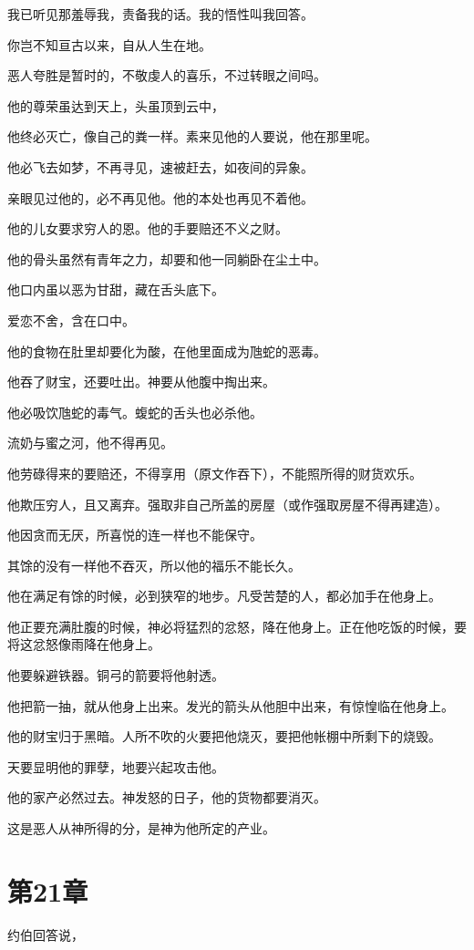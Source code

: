 \documentclass[12pt,oneside]{book}
\begin{document}
我已听见那羞辱我，责备我的话。我的悟性叫我回答。

你岂不知亘古以来，自从人生在地。

恶人夸胜是暂时的，不敬虔人的喜乐，不过转眼之间吗。

他的尊荣虽达到天上，头虽顶到云中，

他终必灭亡，像自己的粪一样。素来见他的人要说，他在那里呢。

他必飞去如梦，不再寻见，速被赶去，如夜间的异象。

亲眼见过他的，必不再见他。他的本处也再见不着他。

他的儿女要求穷人的恩。他的手要赔还不义之财。

他的骨头虽然有青年之力，却要和他一同躺卧在尘土中。

他口内虽以恶为甘甜，藏在舌头底下。

爱恋不舍，含在口中。

他的食物在肚里却要化为酸，在他里面成为虺蛇的恶毒。

他吞了财宝，还要吐出。神要从他腹中掏出来。

他必吸饮虺蛇的毒气。蝮蛇的舌头也必杀他。

流奶与蜜之河，他不得再见。

他劳碌得来的要赔还，不得享用（原文作吞下），不能照所得的财货欢乐。

他欺压穷人，且又离弃。强取非自己所盖的房屋（或作强取房屋不得再建造）。

他因贪而无厌，所喜悦的连一样也不能保守。

其馀的没有一样他不吞灭，所以他的福乐不能长久。

他在满足有馀的时候，必到狭窄的地步。凡受苦楚的人，都必加手在他身上。

他正要充满肚腹的时候，神必将猛烈的忿怒，降在他身上。正在他吃饭的时候，要将这忿怒像雨降在他身上。

他要躲避铁器。铜弓的箭要将他射透。

他把箭一抽，就从他身上出来。发光的箭头从他胆中出来，有惊惶临在他身上。

他的财宝归于黑暗。人所不吹的火要把他烧灭，要把他帐棚中所剩下的烧毁。

天要显明他的罪孽，地要兴起攻击他。

他的家产必然过去。神发怒的日子，他的货物都要消灭。

这是恶人从神所得的分，是神为他所定的产业。


\chapter{第21章}
约伯回答说，
\end{document}
